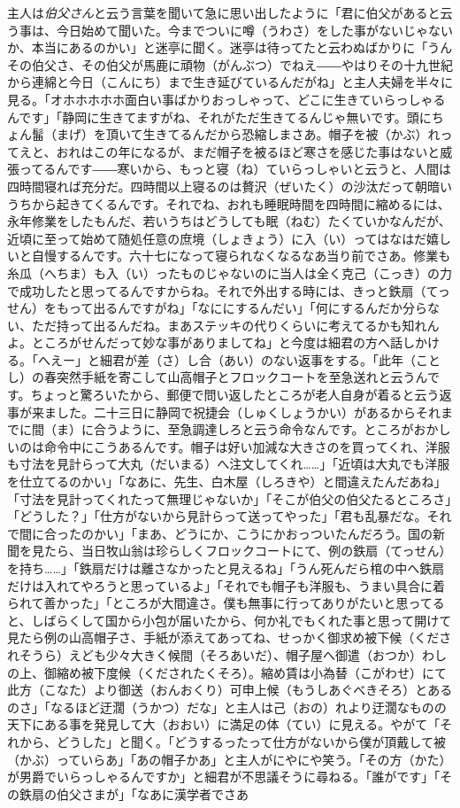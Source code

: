 \documentclass{book}
\begin{document}
主人は\emph{伯父さん}と云う言葉を聞いて急に思い出したように「君に伯父があると云う事は、今日始めて聞いた。今までついに噂（うわさ）をした事がないじゃないか、本当にあるのかい」と迷亭に聞く。迷亭は待ってたと云わぬばかりに「うんその伯父さ、その伯父が馬鹿に頑物（がんぶつ）でねえ――やはりその十九世紀から連綿と今日（こんにち）まで生き延びているんだがね」と主人夫婦を半々に見る。「オホホホホホ面白い事ばかりおっしゃって、どこに生きていらっしゃるんです」「静岡に生きてますがね、それがただ生きてるんじゃ無いです。頭にちょん髷（まげ）を頂いて生きてるんだから恐縮しまさあ。帽子を被（かぶ）れってえと、おれはこの年になるが、まだ帽子を被るほど寒さを感じた事はないと威張ってるんです――寒いから、もっと寝（ね）ていらっしゃいと云うと、人間は四時間寝れば充分だ。四時間以上寝るのは贅沢（ぜいたく）の沙汰だって朝暗いうちから起きてくるんです。それでね、おれも睡眠時間を四時間に縮めるには、永年修業をしたもんだ、若いうちはどうしても眠（ねむ）たくていかなんだが、近頃に至って始めて随処任意の庶境（しょきょう）に入（い）ってはなはだ嬉しいと自慢するんです。六十七になって寝られなくなるなあ当り前でさあ。修業も糸瓜（へちま）も入（い）ったものじゃないのに当人は全く克己（こっき）の力で成功したと思ってるんですからね。それで外出する時には、きっと鉄扇（てっせん）をもって出るんですがね」「なににするんだい」「何にするんだか分らない、ただ持って出るんだね。まあステッキの代りくらいに考えてるかも知れんよ。ところがせんだって妙な事がありましてね」と今度は細君の方へ話しかける。「へえー」と細君が差（さ）し合（あい）のない返事をする。「此年（ことし）の春突然手紙を寄こして山高帽子とフロックコートを至急送れと云うんです。ちょっと驚ろいたから、郵便で問い返したところが老人自身が着ると云う返事が来ました。二十三日に静岡で祝捷会（しゅくしょうかい）があるからそれまでに間（ま）に合うように、至急調達しろと云う命令なんです。ところがおかしいのは命令中にこうあるんです。帽子は好い加減な大きさのを買ってくれ、洋服も寸法を見計らって大丸（だいまる）へ注文してくれ\ldots{}\ldots{}」「近頃は大丸でも洋服を仕立てるのかい」「なあに、先生、白木屋（しろきや）と間違えたんだあね」「寸法を見計ってくれたって無理じゃないか」「そこが伯父の伯父たるところさ」「どうした？」「仕方がないから見計らって送ってやった」「君も乱暴だな。それで間に合ったのかい」「まあ、どうにか、こうにかおっついたんだろう。国の新聞を見たら、当日牧山翁は珍らしくフロックコートにて、例の鉄扇（てっせん）を持ち\ldots{}\ldots{}」「鉄扇だけは離さなかったと見えるね」「うん死んだら棺の中へ鉄扇だけは入れてやろうと思っているよ」「それでも帽子も洋服も、うまい具合に着られて善かった」「ところが大間違さ。僕も無事に行ってありがたいと思ってると、しばらくして国から小包が届いたから、何か礼でもくれた事と思って開けて見たら例の山高帽子さ、手紙が添えてあってね、せっかく御求め被下候（くだされそうら）えども少々大きく候間（そろあいだ）、帽子屋へ御遣（おつか）わしの上、御縮め被下度候（くだされたくそろ）。縮め賃は小為替（こがわせ）にて此方（こなた）より御送（おんおくり）可申上候（もうしあぐべきそろ）とあるのさ」「なるほど迂濶（うかつ）だな」と主人は己（おの）れより迂濶なものの天下にある事を発見して大（おおい）に満足の体（てい）に見える。やがて「それから、どうした」と聞く。「どうするったって仕方がないから僕が頂戴して被（かぶ）っていらあ」「あの帽子かあ」と主人がにやにや笑う。「その方（かた）が男爵でいらっしゃるんですか」と細君が不思議そうに尋ねる。「誰がです」「その鉄扇の伯父さまが」「なあに漢学者でさあ
\end{document}
